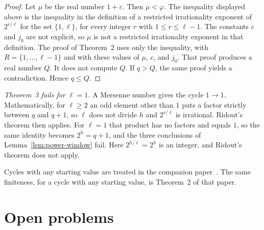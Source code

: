 \documentclass[11pt]{article}
\begin{document}
\begin{proof}
Let $\mu$ be the real number $1 + \varepsilon$.
Then $\mu < \varphi$.
The inequality displayed above is the inequality in the definition of a restricted irrationality exponent of $2^{r/\ell}$ for the set $\{1, \ell\}$, for every integer $r$ with $1 \le r \le \ell - 1$.
The constants $c$ and $j_0$ are not explicit, so $\mu$ is not a restricted irrationality exponent in that definition.
The proof of Theorem~2 uses only the inequality, with $R = \{1, \ldots, \ell-1\}$ and with these values of $\mu$, $c$, and $j_0$.
That proof produces a real number $Q$.
It does not compute $Q$.
If $q > Q$, the same proof yields a contradiction.
Hence $q \le Q$.
\end{proof}

\emph{Theorem~3 fails for $\ell = 1$.}
A Mersenne number gives the cycle $1 \to 1$.
Mathematically, for $\ell \ge 2$ an odd element other than $1$ puts a factor strictly between $q$ and $q+1$, so $\ell$ does not divide $h$ and $2^{r/\ell}$ is irrational.
Ridout's theorem then applies.
For $\ell = 1$ that product has no factors and equals $1$, so the same identity becomes $2^h = q + 1$, and the three conclusions of Lemma~\ref{lem:power-window} fail.
Here $2^{h/\ell} = 2^h$ is an integer, and Ridout's theorem does not apply.

Cycles with any starting value are treated in the companion paper~\cite{hackman-ii}.
The same finiteness, for a cycle with any starting value, is Theorem~2 of that paper.

\section{Open problems}
\label{sec:open}
\end{document}
